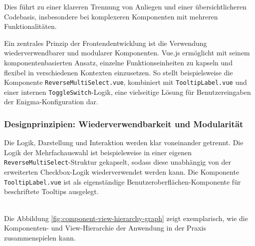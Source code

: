 \documentclass[12pt, ngerman, a4paper, numbers=noenddot]{article}
\begin{document}
Dies führt zu einer klareren Trennung von Anliegen und einer übersichtlicheren Codebasis, insbesondere bei komplexeren Komponenten mit mehreren Funktionalitäten.

Ein zentrales Prinzip der Frontendentwicklung ist die Verwendung wiederverwendbarer und modularer Komponenten. Vue.js ermöglicht mit seinem komponentenbasierten Ansatz, einzelne Funktionseinheiten zu kapseln und flexibel in verschiedenen Kontexten einzusetzen. So stellt beispielsweise die Komponente \newline \lstinline|ReverseMultiSelect.vue|, kombiniert mit \lstinline|TooltipLabel.vue| und einer internen \lstinline|ToggleSwitch|-Logik, eine vielseitige Lösung für Benutzereingaben der Enigma-Konfiguration dar.


\subsubsection{Designprinzipien: Wiederverwendbarkeit und Modularität}

Die Logik, Darstellung und Interaktion werden klar voneinander getrennt. Die Logik der Mehrfachauswahl ist beispielsweise in einer eigenen \lstinline|ReverseMultiSelect|\newline -Struktur gekapselt, sodass diese unabhängig von der erweiterten Checkbox-Logik wiederverwendet werden kann. Die Komponente \lstinline|TooltipLabel.vue| ist als eigenständige Benutzeroberflächen-Komponente für beschriftete Tooltips ausgelegt.

\ \\
Die Abbildung \ref{fig:component-view-hierarchy-graph} zeigt exemplarisch, wie die Komponenten- und View-Hierarchie der Anwendung in der Praxis zusammenspielen kann.
\ \\

%
\end{document}
